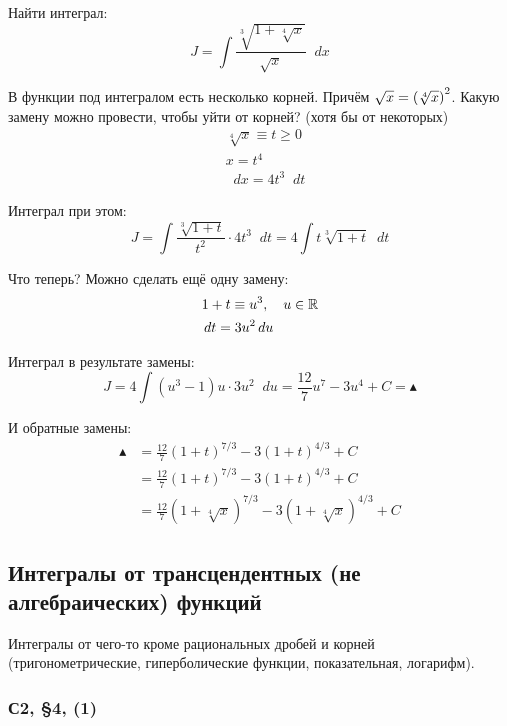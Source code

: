 \documentclass[a4paper,12pt]{article}
\newcommand{\diff}{\mathop{}\!d}
\begin{document}
  Найти интеграл:
  \[
    J = \int \frac{
      \sqrt[3]{1 + \sqrt[4]{x}}
    }{
      \sqrt{x}
    } \diff x
  \]
  
  \begin{solution}
    В функции под интегралом есть несколько корней.
    Причём $\sqrt x \hm= \left(\sqrt[4]{x}\right)^2$.
    Какую замену можно провести, чтобы уйти от корней? (хотя бы от некоторых)
    \[
      \begin{aligned}
        &\sqrt[4]{x} \equiv t \geq 0\\
        &x = t^4\\
        &\diff x = 4t^3 \diff t
      \end{aligned}
    \]

    Интеграл при этом:
    \[
      J = \int \frac{\sqrt[3]{1 + t}}{t^2} \cdot 4t^3 \diff t = 4 \int t \sqrt[3]{1 + t} \diff t
    \]

    Что теперь?
    Можно сделать ещё одну замену:
    \[
      \begin{aligned}
        &1 + t \equiv u^3,\quad u \in \RR\\
        &\diff t = 3u^2 \diff u
      \end{aligned}
    \]

    Интеграл в результате замены:
    \[
      J = 4 \int (u^3 - 1) u \cdot 3u^2 \diff u = \frac{12}{7} u^7 - 3u^4 + C = \blacktriangle
    \]

    И обратные замены:
    \begin{equation*}
    \begin{split}
      \blacktriangle &= \frac{12}{7} (1 + t)^{7/3} - 3(1 + t)^{4/3} + C\\
        &= \frac{12}{7} (1 + t)^{7/3} - 3(1 + t)^{4/3} + C\\
        &= \frac{12}{7} \left(1 + \sqrt[4]{x}\right)^{7/3} - 3 \left(1 + \sqrt[4]{x}\right)^{4/3} + C
    \end{split}
    \end{equation*}
  \end{solution}


  \subsection{Интегралы от трансцендентных (не алгебраических) функций}

  Интегралы от чего-то кроме рациональных дробей и корней (тригонометрические, гиперболические функции, показательная, логарифм).

  \subsubsection{С2, \S 4, (1)}
\end{document}
